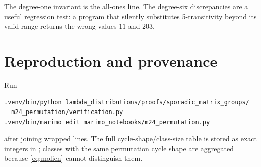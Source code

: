 \documentclass[11pt]{article}
\begin{document}
The degree-one invariant is the all-ones line.  The degree-six discrepancies
are a useful regression test: a program that silently substitutes
5-transitivity beyond its valid range returns the wrong values $11$ and
$203$.

\section{Reproduction and provenance}
Run
\begin{verbatim}
.venv/bin/python lambda_distributions/proofs/sporadic_matrix_groups/
  m24_permutation/verification.py
.venv/bin/marimo edit marimo_notebooks/m24_permutation.py
\end{verbatim}
after joining wrapped lines.  The full cycle-shape/class-size table is stored
as exact integers in ; classes with
the same permutation cycle shape are aggregated because \eqref{eq:molien}
cannot distinguish them.
\end{document}
